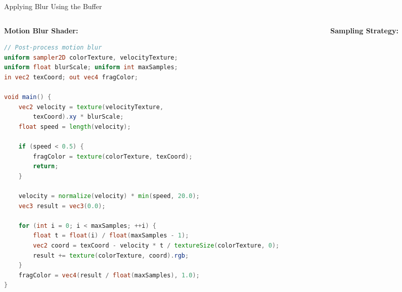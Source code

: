 \documentclass[aspectratio=169]{beamer}
\begin{document}
\begin{frame}[fragile,shrink=12]{Applying Blur Using the Buffer}
    \begin{columns}[t]
        \begin{column}{0.44\textwidth}
            \textbf{Motion Blur Shader:}
            \begin{lstlisting}[language=GLSL, basicstyle=\tiny\ttfamily, numbers=none, backgroundcolor=\color{blue!8}, frame=single]
// Post-process motion blur
uniform sampler2D colorTexture, velocityTexture;
uniform float blurScale; uniform int maxSamples;
in vec2 texCoord; out vec4 fragColor;

void main() {
    vec2 velocity = texture(velocityTexture, 
        texCoord).xy * blurScale;
    float speed = length(velocity);
    
    if (speed < 0.5) { 
        fragColor = texture(colorTexture, texCoord); 
        return; 
    }
    
    velocity = normalize(velocity) * min(speed, 20.0);
    vec3 result = vec3(0.0);
    
    for (int i = 0; i < maxSamples; ++i) {
        float t = float(i) / float(maxSamples - 1);
        vec2 coord = texCoord - velocity * t / textureSize(colorTexture, 0);
        result += texture(colorTexture, coord).rgb;
    }
    fragColor = vec4(result / float(maxSamples), 1.0);
}
            \end{lstlisting}
        \end{column}
        
        \begin{column}{0.32\textwidth}
            \textbf{Sampling Strategy:}
            

\end{column}
\end{columns}
\end{frame}
\end{document}
